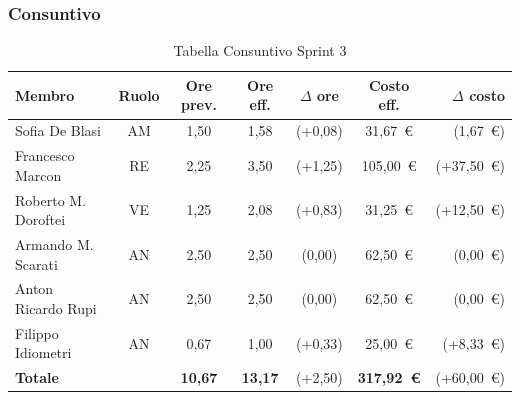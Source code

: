 \subsubsection{Consuntivo}
\begin{table}[H]
    \centering
    \renewcommand{\arraystretch}{1.3}
    \begin{tabularx}{\textwidth}{|X|c|c|c|c|c|r|}
        \hline
        \textbf{Membro} & \textbf{Ruolo} & \textbf{Ore prev.} &
        \textbf{Ore eff.} & \textbf{$\Delta$ ore} &
        \textbf{Costo eff.} & \textbf{$\Delta$ costo} \\
        \hline
        Sofia De Blasi           & AM & 1,50 & 1,58 & {\color{red}(+0,08)} & 31{,}67~\euro & {\color{red}(1{,}67~\euro)} \\
        Francesco Marcon         & RE & 2,25 & 3,50 & {\color{red}(+1,25)} & 105{,}00~\euro & {\color{red}(+37{,}50~\euro)} \\
        Roberto M. Doroftei      & VE & 1,25 & 2,08 & {\color{red}(+0,83)} & 31{,}25~\euro & {\color{red}(+12{,}50~\euro)} \\
        Armando M. Scarati       & AN & 2,50 & 2,50 & {\color{green}(0,00)} & 62{,}50~\euro & {\color{green}(0{,}00~\euro)} \\
        Anton Ricardo Rupi       & AN & 2,50 & 2,50 & {\color{green}(0,00)} & 62{,}50~\euro & {\color{green}(0{,}00~\euro)} \\
        Filippo Idiometri        & AN & 0,67 & 1,00 & {\color{red}(+0,33)} & 25{,}00~\euro & {\color{red}(+8{,}33~\euro)} \\
        \hline
        \textbf{Totale}          &    & \textbf{10,67} &
        \textbf{13,17} & {\color{red}(+2,50)} &
        \textbf{317{,}92~\euro} & {\color{red}(+60{,}00~\euro)} \\
        \hline
    \end{tabularx}
    \caption{Tabella Consuntivo Sprint 3}   
\end{table}
